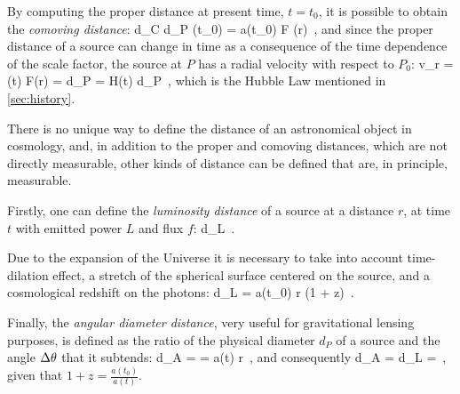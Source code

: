 By computing the proper distance at present time, $t = t_0$, it is possible to obtain the \emph{comoving distance}:
\be
\label{eq:1.17}
d_C \equiv d_P (t_0) = a(t_0) F (r) \,,
\ee
and since the proper distance of a source can change in time as a consequence of the time dependence of the scale factor, the source at $P$ has a radial velocity with respect to $P_0$:
\be
\label{eq:1.18}
v_r = (t) F(r) =  d_P = H(t) d_P \,,
\ee
which is the Hubble Law mentioned in \cref{sec:history}.

There is no unique way to define the distance of an astronomical object in cosmology, and, in addition to the proper and comoving distances, which are not directly measurable, other kinds of distance can be defined that are, in principle, measurable.

Firstly, one can define the \emph{luminosity distance} of a source at a distance $r$, at time $t$ with emitted power $L$ and flux $f$:
\be
\label{eq:1.19}
d_L \equiv {} \,.
\ee

Due to the expansion of the Universe it is necessary to take into account time-dilation effect, a stretch of the spherical surface centered on the source, and a cosmological redshift on the photons:
\be
\label{eq:1.20}
d_L = a(t_0) r (1 + z) \,.
\ee

Finally, the \emph{angular diameter distance}, very useful for gravitational lensing purposes, is defined as the ratio of the physical diameter $d_P$ of a source and the angle $\Delta \theta$ that it subtends:
\be
\label{eq:1.21}
d_A =  = a(t) r \,,
\ee
and consequently
\be
\label{eq:1.22}
d_A = d_L  =  \,,
\ee
given that $1 + z = \frac{a(t_0)}{a(t)}$.
